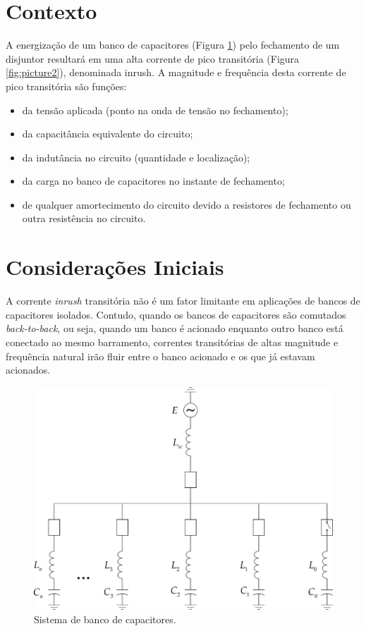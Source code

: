 \documentclass[a4paper]{article}
\begin{document}

\section{Contexto}
A energização de um banco de capacitores (Figura \ref{fig:picture1}) pelo fechamento de um disjuntor resultará em uma alta corrente de pico transitória (Figura \ref{fig:picture2}), denominada inrush. A magnitude e frequência desta corrente de pico transitória são funções:
\begin{itemize}[label=\textendash]
\item	da tensão aplicada (ponto na onda de tensão no fechamento);
\item	da capacitância equivalente do circuito;
\item	da indutância no circuito (quantidade e localização);
\item	da carga no banco de capacitores no instante de fechamento;
\item	de qualquer amortecimento do circuito devido a resistores de fechamento ou outra resistência no circuito.
\end{itemize}
	
\section{Considerações Iniciais}

A corrente \textit{inrush} transitória não é um fator limitante em aplicações de bancos de capacitores isolados. Contudo, quando os bancos de capacitores são comutados \textit{back-to-back}, ou seja, quando um banco é acionado enquanto outro banco está conectado ao mesmo barramento, correntes transitórias de altas magnitude e frequência natural irão fluir entre o banco acionado e os que já estavam acionados.

	
\begin{figure}[!hbp]
	\centering
	\includegraphics{figs/Picture1}
	\caption{Sistema de banco de capacitores.}
	\label{fig:picture1}
\end{figure}
\end{document}
